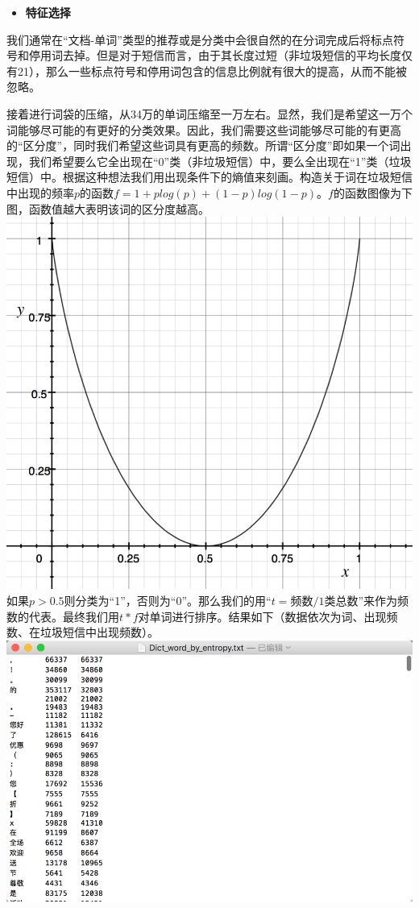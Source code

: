 \documentclass{article}
\begin{document}
\begin{itemize}
\tightlist
\item
  \textbf{特征选择}
\end{itemize}

我们通常在``文档-单词''类型的推荐或是分类中会很自然的在分词完成后将标点符号和停用词去掉。但是对于短信而言，由于其长度过短（非垃圾短信的平均长度仅有21），那么一些标点符号和停用词包含的信息比例就有很大的提高，从而不能被忽略。

接着进行词袋的压缩，从34万的单词压缩至一万左右。显然，我们是希望这一万个词能够尽可能的有更好的分类效果。因此，我们需要这些词能够尽可能的有更高的``区分度''，同时我们希望这些词具有更高的频数。所谓``区分度''即如果一个词出现，我们希望要么它全出现在``0''类（非垃圾短信）中，要么全出现在``1''类（垃圾短信）中。根据这种想法我们用出现条件下的熵值来刻画。构造关于词在垃圾短信中出现的频率\(p\)的函数\(f = 1 + p log(p) + (1 - p)log(1 - p)\)。\(f\)的函数图像为下图，函数值越大表明该词的区分度越高。
\includegraphics{./images/cjw-3.png}
如果\(p > 0.5\)则分类为``1''，否则为``0''。那么我们的用``\(t = 频数/1类总数\)''来作为频数的代表。最终我们用\(t*f\)对单词进行排序。结果如下（数据依次为词、出现频数、在垃圾短信中出现频数）。
\includegraphics{./images/cjw-4.png}
\end{document}
